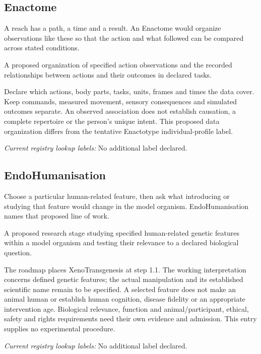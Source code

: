 \subsection*{Enactome}
\noindent A reach has a path, a time and a result. An Enactome would organize observations like these so that the action and what followed can be compared across stated conditions.\par
\noindent A proposed organization of specified action observations and the recorded relationships between actions and their outcomes in declared tasks.\par
\noindent Declare which actions, body parts, tasks, units, frames and times the data cover. Keep commands, measured movement, sensory consequences and simulated outcomes separate. An observed association does not establish causation, a complete repertoire or the person’s unique intent. This proposed data organization differs from the tentative Enactotype individual-profile label.\par


\noindent\textit{Current registry lookup labels:} No additional label declared.\par

\subsection*{EndoHumanisation}
\noindent Choose a particular human-related feature, then ask what introducing or studying that feature would change in the model organism. EndoHumanisation names that proposed line of work.\par
\noindent A proposed research stage studying specified human-related genetic features within a model organism and testing their relevance to a declared biological question.\par
\noindent The roadmap places XenoTransgenesis at step 1.1. The working interpretation concerns defined genetic features; the actual manipulation and its established scientific name remain to be specified. A selected feature does not make an animal human or establish human cognition, disease fidelity or an appropriate intervention age. Biological relevance, function and animal/participant, ethical, safety and rights requirements need their own evidence and admission. This entry supplies no experimental procedure.\par


\noindent\textit{Current registry lookup labels:} No additional label declared.\par

